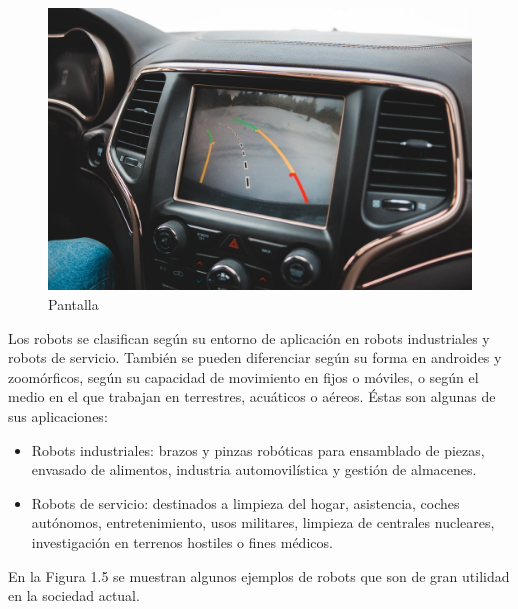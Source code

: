 \begin{figure}[H]
\begin{minipage}[b]{0.5\linewidth}
    \includegraphics[width=.65\linewidth]{chapters/images/pantalla.jpeg} 
    \caption{Pantalla} 
  \end{minipage} 
\end{figure}

Los robots se clasifican según su entorno de aplicación en robots industriales y robots de servicio. También se pueden diferenciar según su forma en androides y zoomórficos, según su capacidad de movimiento en fijos o móviles, o según el medio en el que trabajan en terrestres, acuáticos o aéreos. Éstas son algunas de sus aplicaciones:
\begin{itemize}
    \item Robots industriales: brazos y pinzas robóticas para ensamblado de piezas, envasado de alimentos, industria automovilística y gestión de almacenes.
    \item Robots de servicio: destinados a limpieza del hogar, asistencia, coches autónomos, entretenimiento, usos militares, limpieza de centrales nucleares, investigación en terrenos hostiles o fines médicos.
\end{itemize} 

 En la Figura 1.5 se muestran algunos ejemplos de robots que son de gran utilidad en la sociedad actual. 

